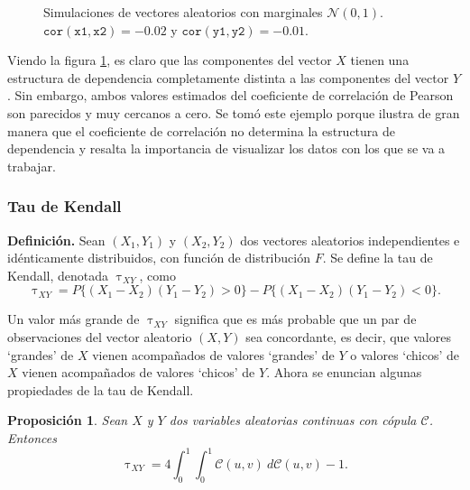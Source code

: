 \documentclass[11pt,a4paper]{article}
\newtheorem{proposition}{Proposición}[subsection]
\begin{document}
\begin{figure}[h]
    \caption{Simulaciones de vectores aleatorios con marginales $\mathcal{N}(0, 1)$. $\mathtt{cor(x1, x2)} = -0.02$ y $\mathtt{cor(y1, y2)} = -0.01$.}
    \label{fig:panel_corr}
\end{figure}

Viendo la figura \ref{fig:panel_corr}, es claro que las componentes del vector $X$ tienen una estructura de dependencia completamente distinta a las componentes del vector $Y$. Sin embargo, ambos valores estimados del coeficiente de correlación de Pearson son parecidos y muy cercanos a cero. Se tomó este ejemplo porque ilustra de gran manera que el coeficiente de correlación no determina la estructura de dependencia y resalta la importancia de visualizar los datos con los que se va a trabajar.\\

\subsubsection*{Tau de Kendall}
\textbf{Definición.} Sean $(X_1, Y_1)$ y $(X_2, Y_2)$ dos vectores aleatorios independientes e idénticamente distribuidos, con función de distribución $F$. Se define la tau de Kendall, denotada $\uptau_{XY}$, como $$\uptau_{XY} = P\{(X_1-X_2)(Y_1-Y_2)>0\} - P\{(X_1-X_2)(Y_1-Y_2)<0\}.$$

Un valor más grande de $\uptau_{XY}$ significa que es más probable que un par de observaciones del vector aleatorio $(X, Y)$ sea concordante, es decir, que valores `grandes' de $X$ vienen acompañados de valores `grandes' de $Y$ o valores `chicos' de $X$ vienen acompañados de valores `chicos' de $Y$. Ahora se enuncian algunas propiedades de la tau de Kendall.\\

\begin{proposition}
Sean $X$ y $Y$ dos variables aleatorias continuas con cópula $\mathcal{C}$. Entonces
$$\uptau_{XY} = 4\int_{0}^1\int_{0}^1\mathcal{C}(u, v) \ d\mathcal{C}(u, v) - 1.$$ 
\end{proposition}
\end{document}

